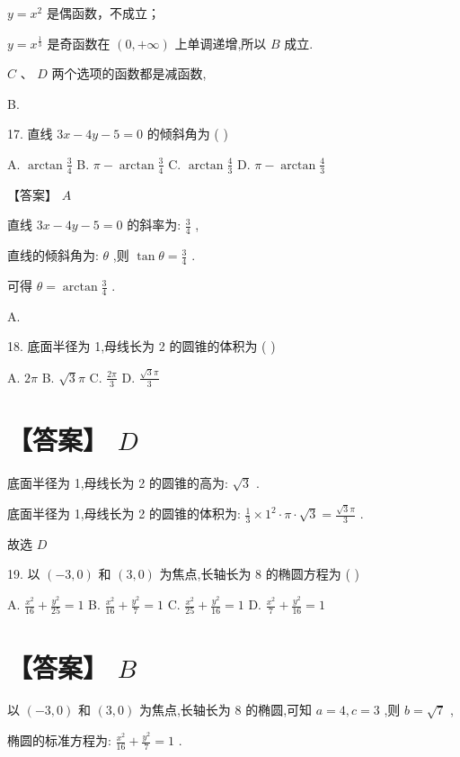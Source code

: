 \documentclass[10pt]{article}
\begin{document}
\(y = {x}^{2}\) 是偶函数，不成立；

\(y = {x}^{\frac{1}{3}}\) 是奇函数在 \(\left( {0, + \infty }\right)\) 上单调递增,所以 \(B\) 成立.

\(C\text{ 、 }D\) 两个选项的函数都是减函数,

B.

17. 直线 \({3x} - {4y} - 5 = 0\) 的倾斜角为 ( )

A. \(\arctan \frac{3}{4}\) B. \(\pi  - \arctan \frac{3}{4}\) C. \(\arctan \frac{4}{3}\) D. \(\pi  - \arctan \frac{4}{3}\)

【答案】 \(A\)

直线 \({3x} - {4y} - 5 = 0\) 的斜率为: \(\frac{3}{4}\) ,

直线的倾斜角为: \(\theta\) ,则 \(\tan \theta  = \frac{3}{4}\) .

可得 \(\theta  = \arctan \frac{3}{4}\) .

A.

18. 底面半径为 1,母线长为 2 的圆锥的体积为 ( )

A. \({2\pi }\) B. \(\sqrt{3}\pi\) C. \(\frac{2\pi }{3}\) D. \(\frac{\sqrt{3}\pi }{3}\)

\section*{【答案】 \(D\)}

底面半径为 1,母线长为 2 的圆锥的高为: \(\sqrt{3}\) .

底面半径为 1,母线长为 2 的圆锥的体积为: \(\frac{1}{3} \times  {1}^{2} \cdot  \pi  \cdot  \sqrt{3} = \frac{\sqrt{3}\pi }{3}\) .

故选 \(D\)

19. 以 \(\left( {-3,0}\right)\) 和 \(\left( {3,0}\right)\) 为焦点,长轴长为 8 的椭圆方程为 ( )

A. \(\frac{{x}^{2}}{16} + \frac{{y}^{2}}{25} = 1\) B. \(\frac{{x}^{2}}{16} + \frac{{y}^{2}}{7} = 1\) C. \(\frac{{x}^{2}}{25} + \frac{{y}^{2}}{16} = 1\) D. \(\frac{{x}^{2}}{7} + \frac{{y}^{2}}{16} = 1\)

\section*{【答案】 \(B\)}

以 \(\left( {-3,0}\right)\) 和 \(\left( {3,0}\right)\) 为焦点,长轴长为 8 的椭圆,可知 \(a = 4,c = 3\) ,则 \(b = \sqrt{7}\) ,

椭圆的标准方程为: \(\frac{{x}^{2}}{16} + \frac{{y}^{2}}{7} = 1\) .
\end{document}
